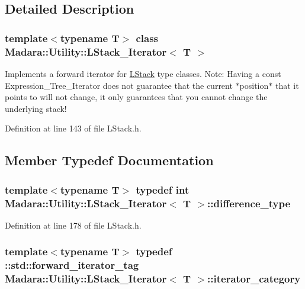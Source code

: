 \subsection{Detailed Description}
\subsubsection*{template$<$typename T$>$ class Madara::Utility::LStack\_\-Iterator$<$ T $>$}

Implements a forward iterator for \hyperlink{classMadara_1_1Utility_1_1LStack}{LStack} type classes. Note: Having a const Expression\_\-Tree\_\-Iterator does not guarantee that the current $\ast$position$\ast$ that it points to will not change, it only guarantees that you cannot change the underlying stack! 

Definition at line 143 of file LStack.h.



\subsection{Member Typedef Documentation}
\hypertarget{classMadara_1_1Utility_1_1LStack__Iterator_a739b69e25bcf2aad445e84764f69e456}{
\subsubsection[{difference\_\-type}]{\setlength{\rightskip}{0pt plus 5cm}template$<$typename T$>$ typedef int {\bf Madara::Utility::LStack\_\-Iterator}$<$ T $>$::{\bf difference\_\-type}}}
\label{df/d6e/classMadara_1_1Utility_1_1LStack__Iterator_a739b69e25bcf2aad445e84764f69e456}


Definition at line 178 of file LStack.h.

\hypertarget{classMadara_1_1Utility_1_1LStack__Iterator_a7263c1420eb6766c1d2405717916aa33}{
\subsubsection[{iterator\_\-category}]{\setlength{\rightskip}{0pt plus 5cm}template$<$typename T$>$ typedef ::std::forward\_\-iterator\_\-tag {\bf Madara::Utility::LStack\_\-Iterator}$<$ T $>$::{\bf iterator\_\-category}}}
\label{df/d6e/classMadara_1_1Utility_1_1LStack__Iterator_a7263c1420eb6766c1d2405717916aa33}


